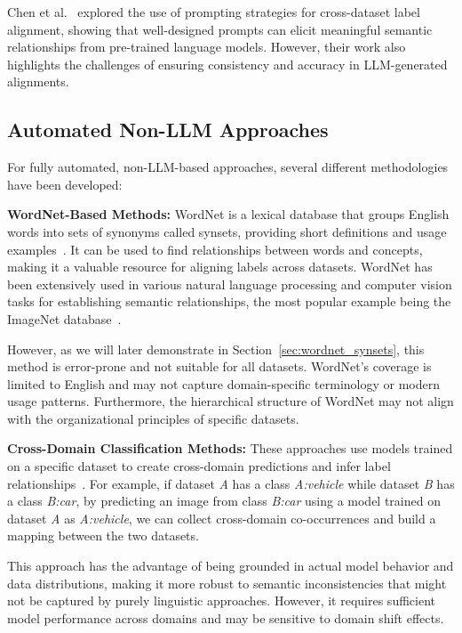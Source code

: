 Chen et al.~\cite{chen_prompting_2023} explored the use of prompting strategies for
cross-dataset label alignment, showing that well-designed prompts can elicit meaningful
semantic relationships from pre-trained language models. However, their work also
highlights the challenges of ensuring consistency and accuracy in LLM-generated
alignments.

\subsection{Automated Non-LLM Approaches}

For fully automated, non-LLM-based approaches, several different methodologies have been
developed:

\textbf{WordNet-Based Methods:} WordNet is a lexical database that groups English words
into sets of synonyms called synsets, providing short definitions and usage
examples~\cite{noauthor_wordnet_nodate,fellbaum_wordnet_1998}.
It can be used to find relationships between words
and concepts, making it a valuable resource for aligning labels across datasets. WordNet
has been extensively used in various natural language processing and computer vision
tasks for establishing semantic relationships,
the most popular example being the ImageNet database~\cite{deng_imagenet_2009}.

However, as we will later demonstrate in Section~\ref{sec:wordnet_synsets}, this method
is error-prone and not suitable for all datasets. WordNet's coverage is limited to
English and may not capture domain-specific terminology or modern usage patterns.
Furthermore, the hierarchical structure of WordNet may not align with the organizational
principles of specific datasets.

\textbf{Cross-Domain Classification Methods:} These approaches use models trained on a
specific dataset to create cross-domain predictions and infer label
relationships~\cite{uijlings_missing_2022,bevandic_automatic_2022,bevandic_weakly_2024}.
For example, if dataset \textit{A} has a class \textit{A:vehicle} while dataset
\textit{B} has a class \textit{B:car}, by predicting an image from class \textit{B:car}
using a model trained on dataset \textit{A} as \textit{A:vehicle}, we can collect
cross-domain co-occurrences and build a mapping between the two datasets.

This approach has the advantage of being grounded in actual model behavior and data
distributions, making it more robust to semantic inconsistencies that might not be
captured by purely linguistic approaches. However, it requires sufficient model
performance across domains and may be sensitive to domain shift effects.

